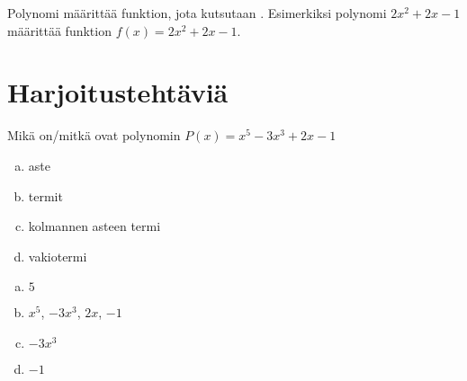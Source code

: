 Polynomi määrittää funktion, jota kutsutaan . Esimerkiksi polynomi $2x^2+2x-1$ määrittää funktion $f(x)=2x^2+2x-1$. 

\begin{comment}
\begin{esimerkki}
Jos polynomi $P$ on $P(x) = 5x^2-3x+2$,
\begin{align*}
&P(-3) = 5(-3)^2-3(-3)+2 = 45 + 9 + 2 = 56 \\
&P(-1) = 5(-1)^2-3(-1)+2 = 5 + 3 + 2 = 10 \\
&P(2) = 5\cdot 2^2-3\cdot 2+2 = 20 - 6 + 2 = 16.
\end{align*}
\end{esimerkki}

Samalla polynomifunktiolla voi olla useampia esityksiä polynomilausekkeena.
Esimerkiksi jos $P(x) = x^2-x^2+x+1$ ja $Q(x) = x+1$, $P$ ja $Q$ ovat samat
funktiot koska $x^2 - x^2 = 0$ kaikilla reaaliluvuilla x. Siis saman
polynomifunktion eri esityksissä lausekkeina suurimman termin aste voi olla
eri, esimerkiksi $P$:ssä se on 2 ja $Q$:ssa 1. Useimmiten kiinnostavin on
kuitenkin pienin mahdollinen aste, jolloin polynomifunktion $P$ aste olisi
myös 1.
\end{comment}

\section{Harjoitustehtäviä}

\begin{tehtava}
	Mikä on/mitkä ovat polynomin $P(x) = x^5-3x^3+2x-1$
	\begin{enumerate}[a)]
		\item aste
		\item termit
		\item kolmannen asteen termi
		\item vakiotermi
	\end{enumerate}

	\begin{vastaus}
		\begin{enumerate}[a)]
			\item $5$
			\item $x^5$, $-3x^3$, $2x$, $-1$
			\item $-3x^3$
			\item $-1$
		\end{enumerate}
	\end{vastaus}
\end{tehtava}

